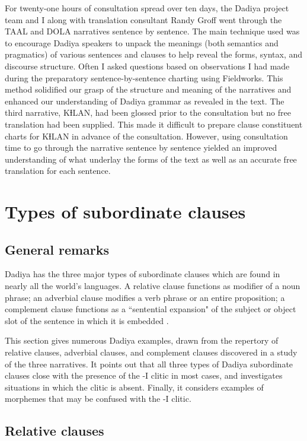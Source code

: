\documentclass[output=paper]{langscibook}
\begin{document}
For twenty-one hours of consultation spread over ten days, the Dadiya project team and I along with translation consultant Randy Groff went through the TAAL and DOLA narratives sentence by sentence. The main technique used was to encourage Dadiya speakers to unpack the meanings (both semantics and pragmatics) of various sentences and clauses to help reveal the forms, syntax, and discourse structure. Often I asked questions based on observations I had made during the preparatory sentence-by-sentence charting using Fieldworks. This method solidified our grasp of the structure and meaning of the narratives and enhanced our understanding of Dadiya grammar as revealed in the text.  The third narrative, KƗLAN, had been glossed prior to the consultation but no free translation had been supplied. This made it difficult to prepare clause constituent charts for KƗLAN in advance of the consultation. However, using consultation time to go through the narrative sentence by sentence yielded an improved understanding of what underlay the forms of the text as well as an accurate free translation for each sentence.

\section{Types of subordinate clauses}\label{sec:dettweiler:3}\largerpage

\subsection{General remarks}

Dadiya has the three major types of subordinate clauses which are found in nearly all the world's languages. A relative clause functions as modifier of a noun phrase; an adverbial clause modifies a verb phrase or an entire proposition; a complement clause functions as a ``sentential expansion" of the subject or object slot of the sentence in which it is embedded \citep[374]{Longacre2007}. 

This section gives numerous Dadiya examples, drawn from the repertory of relative clauses, adverbial clauses, and complement clauses discovered in a study of the three narratives. It points out that all three types of Dadiya subordinate clauses close with the presence of the -I clitic in most cases, and investigates situations in which the clitic is absent. Finally, it  considers examples of morphemes that may be confused with the -I clitic.

\subsection{Relative clauses}
\end{document}
